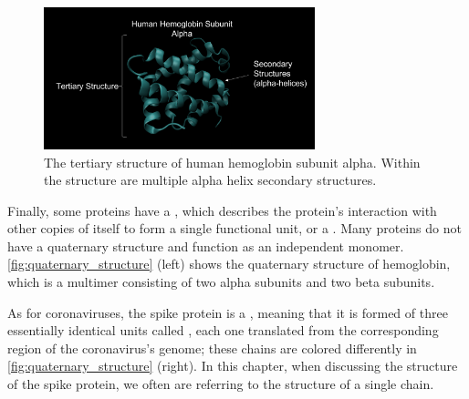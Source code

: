\begin{figure}[h]
	\centering
	\mySfFamily
	\includegraphics[width = 0.7\textwidth]{../images/hemoglobin_tertiary_structure.png}
	\caption{The tertiary structure of human hemoglobin subunit alpha. Within the structure are multiple alpha helix secondary structures.}
	\label{fig:hemoglobin_tertiary_structure}
\end{figure}

Finally, some proteins have a , which describes the protein’s interaction with other copies of itself to form a single functional unit, or a . Many proteins do not have a quaternary structure and function as an independent monomer. \autoref{fig:quaternary_structure} (left) shows the quaternary structure of hemoglobin, which is a multimer consisting of two alpha subunits and two beta subunits.

As for coronaviruses, the spike protein is a , meaning that it is formed of three essentially identical units called , each one translated from the corresponding region of the coronavirus's genome; these chains are colored differently in \autoref{fig:quaternary_structure} (right). In this chapter, when discussing the structure of the spike protein, we often are referring to the structure of a single chain.\\

